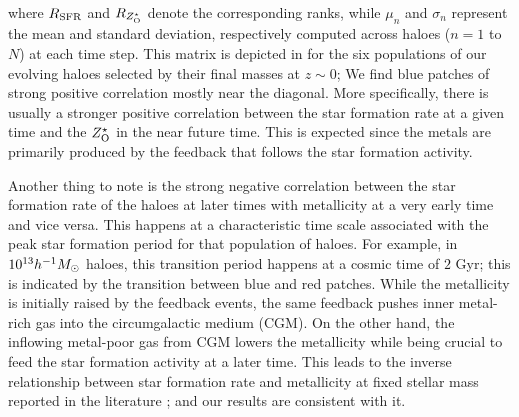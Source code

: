 % 
where $R_{\rm{SFR}}$ and $R_{Z^{\star}_{\rm{O}}}$ denote the corresponding ranks, while $\mu_n$ and $\sigma_n$ represent the mean and standard deviation, respectively computed across haloes ($n=1$ to $N$) at each time step. This matrix is depicted in  for the six populations of our evolving haloes selected by their final masses at $z \sim 0$; We find blue patches of strong positive correlation mostly near the diagonal. 
More specifically, there is usually a stronger positive correlation between the star formation rate at a given time and the $Z^{\star}_{\rm{O}}$ in the near future time. This is expected since the metals are primarily produced by the feedback that follows the star formation activity. 

Another thing to note is the strong negative correlation between the star formation rate of the haloes at later times with metallicity at a very early time and vice versa. 
This happens at a characteristic time scale associated with the peak star formation period for that population of haloes. 
For example, in $10^{13} h^{-1}M_{\odot}$ haloes, this transition period happens at a cosmic time of $2$ Gyr; this is indicated by the transition between blue and red patches. 
% 
While the metallicity is initially raised by the feedback events, the same feedback pushes inner metal-rich gas into the circumgalactic medium (CGM). On the other hand, the inflowing metal-poor gas from CGM lowers the metallicity while being crucial to feed the star formation activity at a later time. 
This leads to the inverse relationship between star formation rate and metallicity at fixed stellar mass reported in the literature \citep[][]{2011DaveFinlatorOppenheimer,2018TorreyVogelsberger_etal_SFRZ}; and our results are consistent with it.

